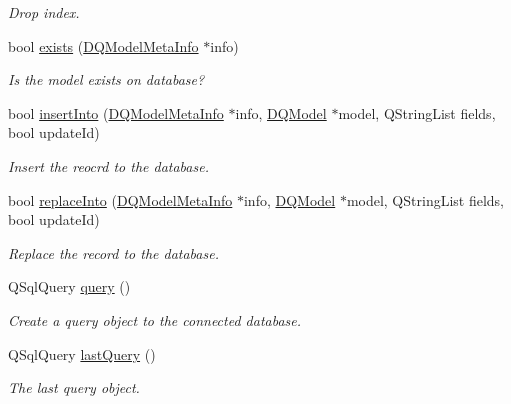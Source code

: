 \begin{DoxyCompactItemize}
\begin{DoxyCompactList}\small\item\em Drop index. \item\end{DoxyCompactList}\item 
\hypertarget{classDQSql_a46fc9527f8a968c693ee34a82b77b234}{
bool \hyperlink{classDQSql_a46fc9527f8a968c693ee34a82b77b234}{exists} (\hyperlink{classDQModelMetaInfo}{DQModelMetaInfo} $\ast$info)}
\label{classDQSql_a46fc9527f8a968c693ee34a82b77b234}

\begin{DoxyCompactList}\small\item\em Is the model exists on database? \item\end{DoxyCompactList}\item 
bool \hyperlink{classDQSql_a5aaf8f147f532fe2044eaf16f98e8ee0}{insertInto} (\hyperlink{classDQModelMetaInfo}{DQModelMetaInfo} $\ast$info, \hyperlink{classDQModel}{DQModel} $\ast$model, QStringList fields, bool updateId)
\begin{DoxyCompactList}\small\item\em Insert the reocrd to the database. \item\end{DoxyCompactList}\item 
bool \hyperlink{classDQSql_a07b32fbaea5d06db981864450283075a}{replaceInto} (\hyperlink{classDQModelMetaInfo}{DQModelMetaInfo} $\ast$info, \hyperlink{classDQModel}{DQModel} $\ast$model, QStringList fields, bool updateId)
\begin{DoxyCompactList}\small\item\em Replace the record to the database. \item\end{DoxyCompactList}\item 
\hypertarget{classDQSql_ac635760ea41ae97c8a492bfc2f21355a}{
QSqlQuery \hyperlink{classDQSql_ac635760ea41ae97c8a492bfc2f21355a}{query} ()}
\label{classDQSql_ac635760ea41ae97c8a492bfc2f21355a}

\begin{DoxyCompactList}\small\item\em Create a query object to the connected database. \item\end{DoxyCompactList}\item 
\hypertarget{classDQSql_a9aa5a1561cbd73dc5f4c271874adc072}{
QSqlQuery \hyperlink{classDQSql_a9aa5a1561cbd73dc5f4c271874adc072}{lastQuery} ()}
\label{classDQSql_a9aa5a1561cbd73dc5f4c271874adc072}

\begin{DoxyCompactList}\small\item\em The last query object. \item\end{DoxyCompactList}\end{DoxyCompactItemize}
